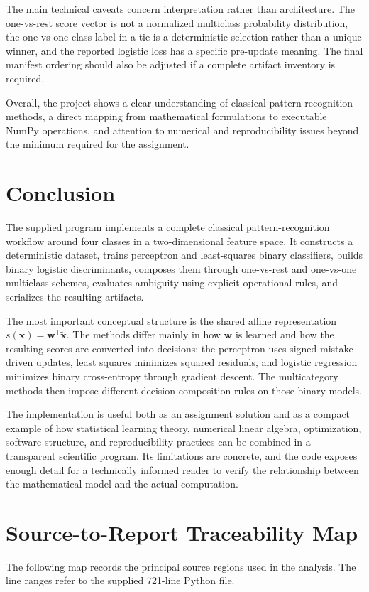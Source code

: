\documentclass[11pt,a4paper]{article}
\begin{document}
The main technical caveats concern interpretation rather than architecture. The one-vs-rest score vector is not a normalized multiclass probability distribution, the one-vs-one class label in a tie is a deterministic selection rather than a unique winner, and the reported logistic loss has a specific pre-update meaning. The final manifest ordering should also be adjusted if a complete artifact inventory is required.

Overall, the project shows a clear understanding of classical pattern-recognition methods, a direct mapping from mathematical formulations to executable NumPy operations, and attention to numerical and reproducibility issues beyond the minimum required for the assignment.

\section{Conclusion}
The supplied program implements a complete classical pattern-recognition workflow around four classes in a two-dimensional feature space. It constructs a deterministic dataset, trains perceptron and least-squares binary classifiers, builds binary logistic discriminants, composes them through one-vs-rest and one-vs-one multiclass schemes, evaluates ambiguity using explicit operational rules, and serializes the resulting artifacts.

The most important conceptual structure is the shared affine representation \(s(\mathbf{x})=\mathbf{w}^{\mathsf T}\tilde{\mathbf{x}}\). The methods differ mainly in how \(\mathbf{w}\) is learned and how the resulting scores are converted into decisions: the perceptron uses signed mistake-driven updates, least squares minimizes squared residuals, and logistic regression minimizes binary cross-entropy through gradient descent. The multicategory methods then impose different decision-composition rules on those binary models.

The implementation is useful both as an assignment solution and as a compact example of how statistical learning theory, numerical linear algebra, optimization, software structure, and reproducibility practices can be combined in a transparent scientific program. Its limitations are concrete, and the code exposes enough detail for a technically informed reader to verify the relationship between the mathematical model and the actual computation.

\appendix
\section{Source-to-Report Traceability Map}
The following map records the principal source regions used in the analysis. The line ranges refer to the supplied 721-line Python file.
\end{document}
